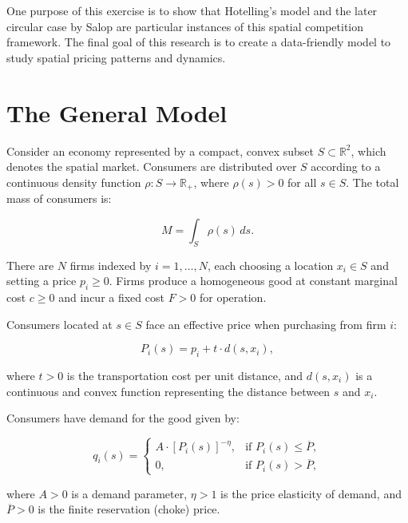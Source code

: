 One purpose of this exercise is to show that Hotelling's model and the later circular case by Salop are particular instances of this spatial competition framework. The final goal of this research is to create a data-friendly model to study spatial pricing patterns and dynamics.

\section{The General Model}

Consider an economy represented by a compact, convex subset \( S \subset \mathbb{R}^2 \), which denotes the spatial market. Consumers are distributed over \( S \) according to a continuous density function \( \rho: S \rightarrow \mathbb{R}_+ \), where \( \rho(s) > 0 \) for all \( s \in S \). The total mass of consumers is:

\begin{equation}
M = \int_S \rho(s) \, ds.
\end{equation}

There are \( N \) firms indexed by \( i = 1, \dots, N \), each choosing a location \( x_i \in S \) and setting a price \( p_i \geq 0 \). Firms produce a homogeneous good at constant marginal cost \( c \geq 0 \) and incur a fixed cost \( F > 0 \) for operation.

Consumers located at \( s \in S \) face an effective price when purchasing from firm \( i \):

\begin{equation}
P_i(s) = p_i + t \cdot d(s, x_i),
\end{equation}

where \( t > 0 \) is the transportation cost per unit distance, and \( d(s, x_i) \) is a continuous and convex function representing the distance between \( s \) and \( x_i \).

Consumers have demand for the good given by:

\begin{equation}
q_i(s) = \begin{cases}
A \cdot [P_i(s)]^{-\eta}, & \text{if } P_i(s) \leq \overline{P}, \\
0, & \text{if } P_i(s) > \overline{P},
\end{cases}
\end{equation}

where \( A > 0 \) is a demand parameter, \( \eta > 1 \) is the price elasticity of demand, and \( \overline{P} > 0 \) is the finite reservation (choke) price.

